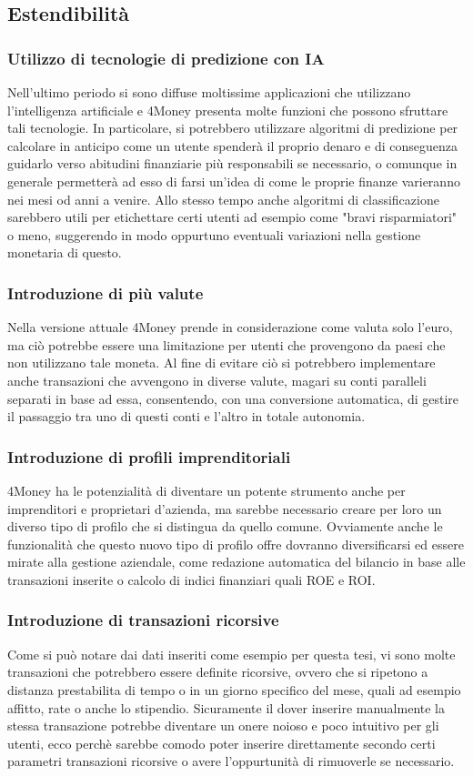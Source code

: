 \documentclass[binding=0.6cm, oneside, noexaminfo, italian]{sapthesis}
\begin{document}
\subsection{Estendibilità}
\subsubsection{Utilizzo di tecnologie di predizione con IA}
Nell'ultimo periodo si sono diffuse moltissime applicazioni che utilizzano l'intelligenza artificiale e 4Money presenta molte funzioni che possono sfruttare tali tecnologie. In particolare, si potrebbero utilizzare algoritmi di predizione per calcolare in anticipo come un utente spenderà il proprio denaro e di conseguenza guidarlo verso abitudini finanziarie più responsabili se necessario, o comunque in generale permetterà ad esso di farsi un'idea di come le proprie finanze varieranno nei mesi od anni a venire. Allo stesso tempo anche algoritmi di classificazione sarebbero utili per etichettare certi utenti ad esempio come "bravi risparmiatori" o meno, suggerendo in modo oppurtuno eventuali variazioni nella gestione monetaria di questo.
\subsubsection{Introduzione di più valute}
Nella versione attuale 4Money prende in considerazione come valuta solo l'euro, ma ciò potrebbe essere una limitazione per utenti che provengono da paesi che non utilizzano tale moneta. Al fine di evitare ciò si potrebbero implementare anche transazioni che avvengono in diverse valute, magari su conti paralleli separati in base ad essa, consentendo, con una conversione automatica, di gestire il passaggio tra uno di questi conti e l'altro in totale autonomia.
\subsubsection{Introduzione di profili imprenditoriali}
4Money ha le potenzialità di diventare un potente strumento anche per imprenditori e proprietari d'azienda, ma sarebbe necessario creare per loro un diverso tipo di profilo che si distingua da quello comune. Ovviamente anche le funzionalità che questo nuovo tipo di profilo offre dovranno diversificarsi ed essere mirate alla gestione aziendale, come redazione automatica del bilancio in base alle transazioni inserite o calcolo di indici finanziari quali ROE e ROI.
\subsubsection{Introduzione di transazioni ricorsive}
Come si può notare dai dati inseriti come esempio per questa tesi, vi sono molte transazioni che potrebbero essere definite ricorsive, ovvero che si ripetono a distanza prestabilita di tempo o in un giorno specifico del mese, quali ad esempio affitto, rate o anche lo stipendio. Sicuramente il dover inserire manualmente la stessa transazione potrebbe diventare un onere noioso e poco intuitivo per gli utenti, ecco perchè sarebbe comodo poter inserire direttamente secondo certi parametri transazioni ricorsive o avere l'oppurtunità di rimuoverle se necessario.
\end{document}
